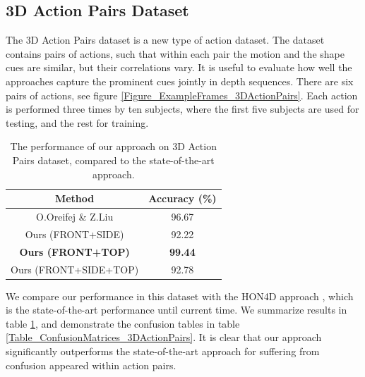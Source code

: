 \documentclass[final,3p,times,twocolumn]{elsarticle}
\begin{document}
\subsection{3D Action Pairs Dataset}

The 3D Action Pairs dataset \cite{oreifej2013hon4d} is a new type of action dataset.
The dataset contains pairs of actions, such that within each pair the motion and the shape cues are similar, but their correlations vary.
It is useful to evaluate how well the approaches capture the prominent cues jointly in depth sequences.
There are six pairs of actions, see figure \ref{Figure_ExampleFrames_3DActionPairs}.
Each action is performed three times by ten subjects, where the first five subjects are used for testing, and the rest for training.

\begin{table}[h]
	\begin{tabular}{c|c}	
		\bf Method & \bf Accuracy (\%) \\
		\hline
		O.Oreifej \& Z.Liu \cite{oreifej2013hon4d}&      96.67 \\
		\hline
		Ours (FRONT+SIDE) &      92.22 \\
		
		\bf Ours (FRONT+TOP) &      \bf 99.44 \\
		
		Ours (FRONT+SIDE+TOP) &      92.78 \\
		
	\end{tabular}  
	
	\caption{The performance of our approach on 3D Action Pairs dataset, compared to the state-of-the-art approach.}
	\label{Table_3DActionPairs_SoA}
\end{table}

We compare our performance in this dataset with the HON4D approach \cite{oreifej2013hon4d}, which is the state-of-the-art performance until current time.
We summarize results in table \ref{Table_3DActionPairs_SoA}, and demonstrate the confusion tables in table \ref{Table_ConfusionMatrices_3DActionPairs}.
It is clear that our approach significantly outperforms the state-of-the-art approach for suffering from confusion appeared within action pairs.
\end{document}
